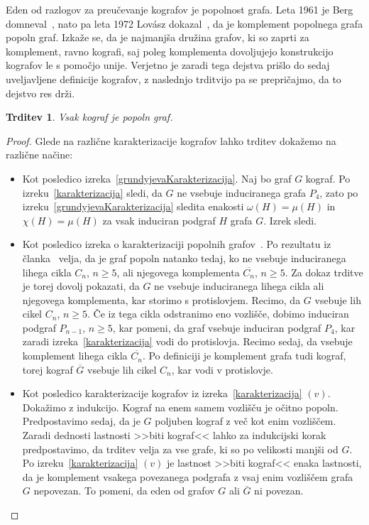 \documentclass[12pt,a4paper,twoside]{article}
\theoremstyle{definition} %
\theoremstyle{plain} %
\newtheorem{trditev}[definicija]{Trditev}
\numberwithin{equation}{section}  %
\begin{document}
Eden od razlogov za preučevanje kografov je popolnost grafa. Leta 1961 je Berg domneval~\cite{berge1961coloring}, nato pa leta 1972 Lovász dokazal~\cite{lovasz1972characterisation}, da je komplement popolnega grafa popoln graf. Izkaže se, da je najmanjša družina grafov, ki so zaprti za komplement, ravno kografi, saj poleg komplementa dovoljujejo konstrukcijo kografov le s pomočjo unije. Verjetno je zaradi tega dejstva prišlo do sedaj uveljavljene definicije kografov, z naslednjo trditvijo pa se prepričajmo, da to dejstvo res drži.

\pagebreak

\begin{trditev} Vsak kograf je popoln graf.
\end{trditev}
\begin{proof}
Glede na različne karakterizacije kografov lahko trditev dokažemo na različne načine:
\begin{itemize}
\item Kot posledico izreka~\ref{grundyjevaKarakterizacija}. Naj bo graf $G$ kograf. Po izreku~\ref{karakterizacija} sledi, da $G$ ne vsebuje induciranega grafa $P_4$, zato po izreku~\ref{grundyjevaKarakterizacija} sledita enakosti $\omega(H)=\mu(H)$ in $\chi(H)=\mu(H)$ za vsak induciran podgraf $H$ grafa $G$. Izrek sledi.

\item Kot posledico izreka o karakterizaciji popolnih grafov~\cite{chudnovsky2006strong}. Po rezultatu iz članka~\cite{chudnovsky2006strong} velja, da je graf popoln natanko tedaj, ko ne vsebuje induciranega lihega cikla $C_n$, $n \geq 5$, ali njegovega komplementa $\overline{C_n}$, $n \geq 5$. Za dokaz trditve je torej dovolj pokazati, da $G$ ne vsebuje induciranega lihega cikla ali njegovega komplementa, kar storimo s protislovjem. Recimo, da $G$ vsebuje lih cikel $C_n$, $n \geq 5$. Če iz tega cikla odstranimo eno vozlišče, dobimo induciran podgraf $P_{n-1}$, $n\geq 5$, kar pomeni, da graf vsebuje induciran podgraf $P_4$, kar zaradi izreka~\ref{karakterizacija} vodi do protislovja. Recimo sedaj, da vsebuje komplement lihega cikla $\overline{C_n}$. Po definiciji je komplement grafa tudi kograf, torej kograf $\overline{G}$ vsebuje lih cikel $C_n$, kar vodi v protislovje.

\item Kot posledico karakterizacije kografov iz izreka~\ref{karakterizacija} $(v)$. Dokažimo z indukcijo. Kograf na enem samem vozlišču je očitno popoln. Predpostavimo sedaj, da je $G$ poljuben kograf z več kot enim vozliščem. Zaradi dednosti lastnosti >>biti kograf<< lahko za indukcijski korak predpostavimo, da trditev velja za vse grafe, ki so po velikosti manjši od $G$. Po izreku~\ref{karakterizacija} $(v)$ je lastnost >>biti kograf<< enaka lastnosti, da je komplement vsakega povezanega podgrafa z vsaj enim vozliščem grafa $G$ nepovezan. To pomeni, da eden od grafov $G$ ali $\overline{G}$ ni povezan.


\end{itemize}
\end{proof}
\end{document}
